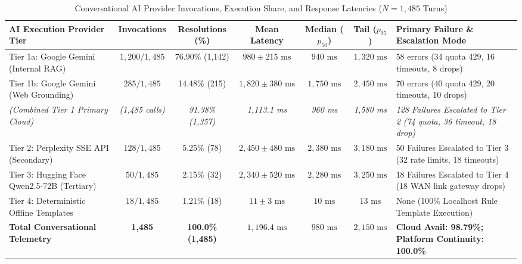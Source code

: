 \documentclass[conference]{IEEEtran}
\begin{document}
\begin{table}[t]
\caption{Conversational AI Provider Invocations, Execution Share, and Response Latencies ($N = 1,485$ Turns)}
\label{tab6}
\centering
\small
\begin{tabularx}{\textwidth}{lcccccX}
\toprule
\textbf{AI Execution Provider Tier} & \textbf{Invocations} & \textbf{Resolutions (\%)} & \textbf{Mean Latency} & \textbf{Median ($p_{50}$)} & \textbf{Tail ($p_{95}$)} & \textbf{Primary Failure \& Escalation Mode} \\
\midrule
Tier 1a: Google Gemini (Internal RAG) & $1,200 / 1,485$ & 76.90\% (1,142) & $980 \pm 215\text{ ms}$ & $940\text{ ms}$ & $1,320\text{ ms}$ & 58 errors (34 quota 429, 16 timeouts, 8 drops) \\
Tier 1b: Google Gemini (Web Grounding) & $285 / 1,485$ & 14.48\% (215) & $1,820 \pm 380\text{ ms}$ & $1,750\text{ ms}$ & $2,450\text{ ms}$ & 70 errors (40 quota 429, 20 timeouts, 10 drops) \\
\textit{(Combined Tier 1 Primary Cloud)} & \textit{(1,485 calls)} & \textit{91.38\% (1,357)} & \textit{1,113.1 ms} & \textit{960 ms} & \textit{1,580 ms} & \textit{128 Failures Escalated to Tier 2 (74 quota, 36 timeout, 18 drop)} \\
Tier 2: Perplexity SSE API (Secondary) & $128 / 1,485$ & 5.25\% (78) & $2,450 \pm 480\text{ ms}$ & $2,380\text{ ms}$ & $3,180\text{ ms}$ & 50 Failures Escalated to Tier 3 (32 rate limits, 18 timeouts) \\
Tier 3: Hugging Face Qwen2.5-72B (Tertiary) & $50 / 1,485$ & 2.15\% (32) & $2,340 \pm 520\text{ ms}$ & $2,280\text{ ms}$ & $3,250\text{ ms}$ & 18 Failures Escalated to Tier 4 (18 WAN link gateway drops) \\
Tier 4: Deterministic Offline Templates & $18 / 1,485$ & 1.21\% (18) & $11 \pm 3\text{ ms}$ & $10\text{ ms}$ & $13\text{ ms}$ & None (100\% Localhost Rule Template Execution) \\
\midrule
\textbf{Total Conversational Telemetry} & \textbf{1,485} & \textbf{100.0\% (1,485)} & \textbf{$1,196.4\text{ ms}$} & \textbf{$980\text{ ms}$} & \textbf{$2,150\text{ ms}$} & \textbf{Cloud Avail: 98.79\%; Platform Continuity: 100.0\%} \\
\bottomrule
\end{tabularx}
\end{table}
\end{document}
